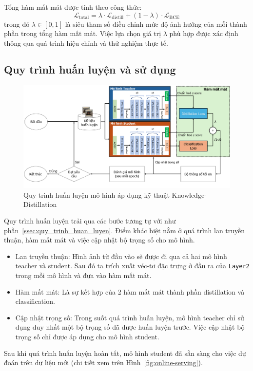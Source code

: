 Tổng hàm mất mát được tính theo công thức:
\begin{equation}
	\mathcal{L}_{\mathrm{total}} = \lambda \cdot \mathcal{L}_{\mathrm{distill}} + (1 - \lambda) \cdot \mathcal{L}_{\mathrm{BCE}}
\end{equation}
trong đó \( \lambda \in [0, 1] \) là siêu tham số điều chỉnh mức độ ảnh hưởng của mỗi thành phần trong tổng hàm mất mát. Việc lựa chọn giá trị \( \lambda \) phù hợp được xác định thông qua quá trình hiệu chỉnh và thử nghiệm thực tế.
%
%
\subsection{Quy trình huấn luyện và sử dụng}
%
\begin{figure}[h!]
	\centering
	\includegraphics[width=1.0\linewidth]{Images/offline-training-process-distillation.png}
	\begin{minipage}{1.0\linewidth}
		\vspace{5mm}
		\caption{Quy trình huấn luyện mô hình áp dụng kỹ thuật Knowledge-Distillation}
		\label{fig:offline-training-process-distillation}
	\end{minipage}
\end{figure}
%
%
Quy trình huấn luyện trải qua các bước tương tự với như phần~\ref{ssec:quy_trinh_huan_luyen}.
%
Điểm khác biệt nằm ở quá trình lan truyền thuận, hàm mất mát và việc cập nhật bộ trọng số cho mô hình.
%
\begin{itemize}
	\item Lan truyền thuận: Hình ảnh từ đầu vào sẽ được đi qua cả hai mô hình \gls{teacher} và \gls{student}. Sau đó ta trích xuất véc-tơ đặc trưng ở đầu ra của \texttt{Layer2} trong mỗi mô hình và đưa vào hàm mất mát.
	
	\item  Hàm mất mát: Là sự kết hợp của 2 hàm mất mát thành phần \gls{distillation} và \gls{classification}.
	
	\item Cập nhật trọng số: Trong suốt quá trình huấn luyện, mô hình \gls{teacher} chỉ sử dụng duy nhất một bộ trọng số đã được huấn luyện trước. Việc cập nhật bộ trọng số chỉ được áp dụng cho mô hình \gls{student}.
\end{itemize}

Sau khi quá trình huấn luyện hoàn tất, mô hình \gls{student} đã sẵn sàng cho việc dự đoán trên dữ liệu mới (chi tiết xem trên Hình~\ref{fig:online-serving}). 







